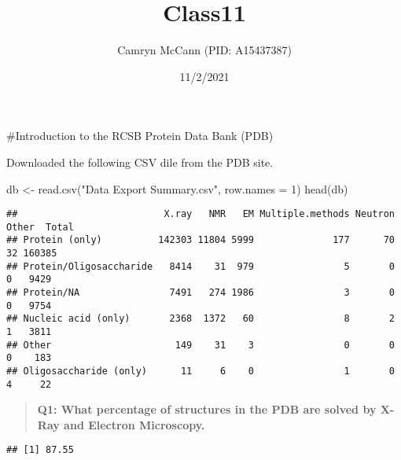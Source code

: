 \documentclass[
]{article}
\title{Class11}
\author{Camryn McCann (PID: A15437387)}
\date{11/2/2021}
\newenvironment{Shaded}{\begin{snugshade}}{\end{snugshade}}
\newcommand{\AttributeTok}[1]{\textcolor[rgb]{0.77,0.63,0.00}{#1}}
\newcommand{\DecValTok}[1]{\textcolor[rgb]{0.00,0.00,0.81}{#1}}
\newcommand{\FunctionTok}[1]{\textcolor[rgb]{0.00,0.00,0.00}{#1}}
\newcommand{\NormalTok}[1]{#1}
\newcommand{\OtherTok}[1]{\textcolor[rgb]{0.56,0.35,0.01}{#1}}
\newcommand{\SpecialCharTok}[1]{\textcolor[rgb]{0.00,0.00,0.00}{#1}}
\newcommand{\StringTok}[1]{\textcolor[rgb]{0.31,0.60,0.02}{#1}}
\begin{document}
\maketitle

\#Introduction to the RCSB Protein Data Bank (PDB)

Downloaded the following CSV dile from the PDB site.

\begin{Shaded}
\begin{Highlighting}[]
\NormalTok{db }\OtherTok{\textless{}{-}} \FunctionTok{read.csv}\NormalTok{(}\StringTok{"Data Export Summary.csv"}\NormalTok{, }\AttributeTok{row.names =} \DecValTok{1}\NormalTok{)}
\FunctionTok{head}\NormalTok{(db)}
\end{Highlighting}
\end{Shaded}

\begin{verbatim}
##                          X.ray   NMR   EM Multiple.methods Neutron Other  Total
## Protein (only)          142303 11804 5999              177      70    32 160385
## Protein/Oligosaccharide   8414    31  979                5       0     0   9429
## Protein/NA                7491   274 1986                3       0     0   9754
## Nucleic acid (only)       2368  1372   60                8       2     1   3811
## Other                      149    31    3                0       0     0    183
## Oligosaccharide (only)      11     6    0                1       0     4     22
\end{verbatim}

\begin{quote}
\textbf{Q1: What percentage of structures in the PDB are solved by X-Ray
and Electron Microscopy.}
\end{quote}

\begin{Shaded}
\end{Shaded}

\begin{verbatim}
## [1] 87.55
\end{verbatim}

\begin{Shaded}
\end{Shaded}
\end{document}
